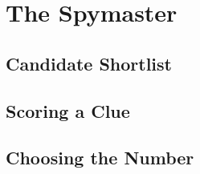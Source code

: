 \section{The Spymaster}\label{sec:spymaster}

\subsection{Candidate Shortlist}

\subsection{Scoring a Clue}

\subsection{Choosing the Number}
